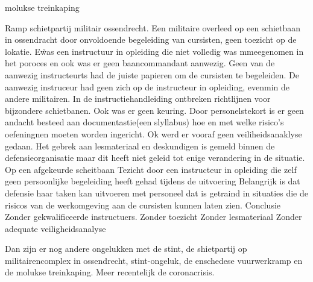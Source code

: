 \cite{sprongken19032018CourtProcedureDigital}

\cite{PROCESREGLEMENTEcourt}
\newline \indent  molukse treinkaping 

\cite{molukseTreinkaping}
\newline \indent Ramp schietpartij militair ossendrecht. Een militaire overleed op een schietbaan in ossendracht door onvoldoende begeleiding van cursisten, geen toezicht op de lokatie. E\r was een instructuur in opleiding die niet volledig was mmeegenomen in het poroces en ook was er geen baancommandant aanwezig. Geen van de aanwezig instructeurts had de juiste papieren om de cursisten te begeleiden. De aanwezig instruceur had geen zich op de instructeur in opleiding, evenmin de andere militairen. In de instructiehandleiding ontbreken richtlijnen voor bijzondere schietbanen. Ook was er geen keuring. Door personelstekort is er geen andacht besteed aan documentastie(een slyllabus) hoe en met welke risico’s oefeningnen moeten worden ingericht. Ok werd er vooraf geen veiliheidsanaklyse gedaan. Het gebrek aan lesmateriaal en deskundigen is gemeld binnen de defensieorganisatie maar dit heeft niet geleid tot enige verandering in de situatie.
Op een afgekeurde scheitbaan
Tezicht door een instructeur in opleiding die zelf geen persoonlijke begeleiding heeft gehad tijdens de uitvoering
Belangrijk is dat defensie haar taken kan uitvoeren met personeel dat is getraind in situaties die de risicos van de werkomgeving aan de cursisten kunnen laten zien.
Conclusie
Zonder gekwalificeerde instructuers.
Zonder toezicht
Zonder lesmateriaal
Zonder adequate veiligheidsanalyse
\cite{ovvVideoOssendrecht}
\cite{oVVSchietongevalOssendrecht}
\cite{nos22032016ossendrecht}
\cite{ovv04042016lessenongevalossendrecht}
\cite{quekelboere10052017doodossendrecht}

\newline \indent Dan zijn er nog andere ongelukken met de stint, de shietpartij op militairencomplex in ossendrecht, stint-ongeluk, de enschedese vuurwerkramp en de molukse treinkaping. Meer recentelijk de coronacrisis.


